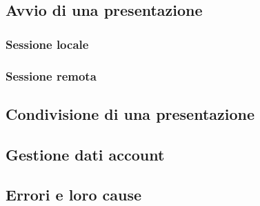\subsection{Avvio di una presentazione}
\subsubsection{Sessione locale}
\subsubsection{Sessione remota}

\subsection{Condivisione di una presentazione}

\subsection{Gestione dati account}

\subsection{Errori e loro cause}

